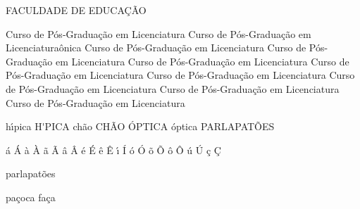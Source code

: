 FACULDADE DE EDUCA\c{C}\~AO

Curso de P\'os-Gradua\c{c}\~ao em Licenciatura
Curso de P\'os-Gradua\c{c}\~ao em Licenciatura\^onica
Curso de P\'os-Gradua\c{c}\~ao em Licenciatura
Curso de P\'os-Gradua\c{c}\~ao em Licenciatura
Curso de P\'os-Gradua\c{c}\~ao em Licenciatura
Curso de P\'os-Gradua\c{c}\~ao em Licenciatura
Curso de P\'os-Gradua\c{c}\~ao em Licenciatura
Curso de P\'os-Gradua\c{c}\~ao em Licenciatura
Curso de P\'os-Gradua\c{c}\~ao em Licenciatura
Curso de P\'os-Gradua\c{c}\~ao em Licenciatura

h\'{\i}pica
H\'{\I}PICA
ch\~ao
CH\~AO
\'OPTICA
\'optica
PARLAPAT\~OES

\'a
\'A
\`a
\`A
\~a
\~A
\^a
\^A
\'e
\'E
\^e
\^E
\'{\i}
\'I
\'o
\'O
\~o
\~O
\^o
\^O
\'u
\'U
\c{c}
\c{C}

parlapat\~oes


pa\c{c}oca
fa\c{c}a



